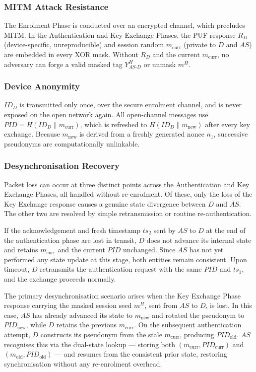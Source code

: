 \documentclass[conference]{IEEEtran}
\begin{document}
\subsubsection{MITM Attack Resistance}
The Enrolment Phase is conducted over an encrypted channel, which precludes
MITM.  In the Authentication and Key Exchange Phases, the PUF response $R_D$ (device-specific, unreproducible) and
session random $m_{\mathrm{curr}}$ (private to $D$ and $AS$) are embedded in
every XOR mask.  Without $R_D$ and the current $m_{\mathrm{curr}}$, no
adversary can forge a valid masked tag $Y_{AS\text{-}D}^H$ or unmask $m^H$.

\subsubsection{Device Anonymity}
$ID_D$ is transmitted only once, over the secure enrolment channel, and is
never exposed on the open network again.  All open-channel messages use
$\mathit{PID} = H(ID_D \| m_{\mathrm{curr}})$, which is refreshed to
$H(ID_D \| m_{\mathrm{new}})$ after every key exchange.  Because $m_{\mathrm{new}}$
is derived from a freshly generated nonce $n_1$, successive pseudonyms are
computationally unlinkable.

\subsubsection{Desynchronisation Recovery}
Packet loss can occur at three distinct points across the Authentication and Key
Exchange Phases, all handled without re-enrolment.  Of these, only the loss of the
Key Exchange response causes a genuine state divergence between $D$ and $AS$.  The
other two are resolved by simple retransmission or routine re-authentication.

If the acknowledgement and fresh timestamp $ts_2$ sent by $AS$ to $D$ at the
end of the authentication phase are lost in transit, $D$ does not advance its internal state
and retains $m_{\mathrm{curr}}$ and the current $\mathit{PID}$ unchanged.
Since $AS$ has not yet performed any state update at this stage, both
entities remain consistent.  Upon timeout, $D$ retransmits the authentication request
with the same $\mathit{PID}$ and $ts_1$, and the exchange proceeds
normally.

The primary desynchronisation scenario arises when the Key Exchange Phase response
carrying the masked session seed $m^H$, sent from $AS$ to $D$, is lost.  In this
case, $AS$ has already advanced its state to $m_{\mathrm{new}}$ and rotated
the pseudonym to $\mathit{PID}_{\mathrm{new}}$, while $D$ retains the
previous $m_{\mathrm{curr}}$.  On the subsequent authentication attempt, $D$
constructs its pseudonym from the stale $m_{\mathrm{curr}}$, producing
$\mathit{PID}_{\mathrm{old}}$.  $AS$ recognises this via the dual-state
lookup --- storing both $(m_{\mathrm{curr}}, \mathit{PID}_{\mathrm{curr}})$ and
$(m_{\mathrm{old}}, \mathit{PID}_{\mathrm{old}})$ --- and resumes from the
consistent prior state, restoring synchronisation without any re-enrolment
overhead.
\end{document}
